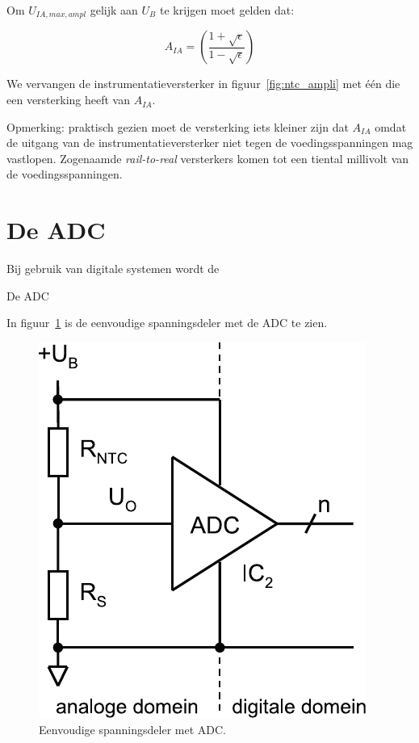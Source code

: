 \documentclass[12pt,a4paper,final,twoside,fleqn]{article}
\let\oldcdot\cdot
\renewcommand{\cdot}{\kern-.10em\oldcdot\kern-.10em}
\begin{document}
Om $U_{IA,max,ampl}$ gelijk aan $U_B$ te krijgen moet gelden dat:


\begin{equation}
A_{IA} = \left(\dfrac{1+\sqrt{\epsilon}}{1-\sqrt{\epsilon}}\right)%
\end{equation}

We vervangen de instrumentatieversterker in figuur~\ref{fig:ntc_ampli} met
\'e\'en die een versterking heeft van $A_{IA}$.

Opmerking: praktisch gezien moet de versterking iets kleiner zijn dat $A_{IA}$
omdat de uitgang van de instrumentatieversterker niet tegen de voedingsspanningen
mag vastlopen. Zogenaamde \textsl{rail-to-real} versterkers komen tot een tiental
millivolt van de voedingsspanningen.



\clearpage
\section{De ADC}
Bij gebruik van digitale systemen wordt de 

De ADC 

In figuur~\ref{fig:ntc_voltagediv_adc} is de eenvoudige spanningsdeler met de ADC
te zien.

\begin{figure}[ht!]
\centering
\includegraphics[scale=0.63]{drawings/ntc_voltagediv_adc}
\caption[Eenvoudige spanningsdeler met ADC]{Eenvoudige spanningsdeler met ADC.}
\label{fig:ntc_voltagediv_adc}
\end{figure}
\end{document}
